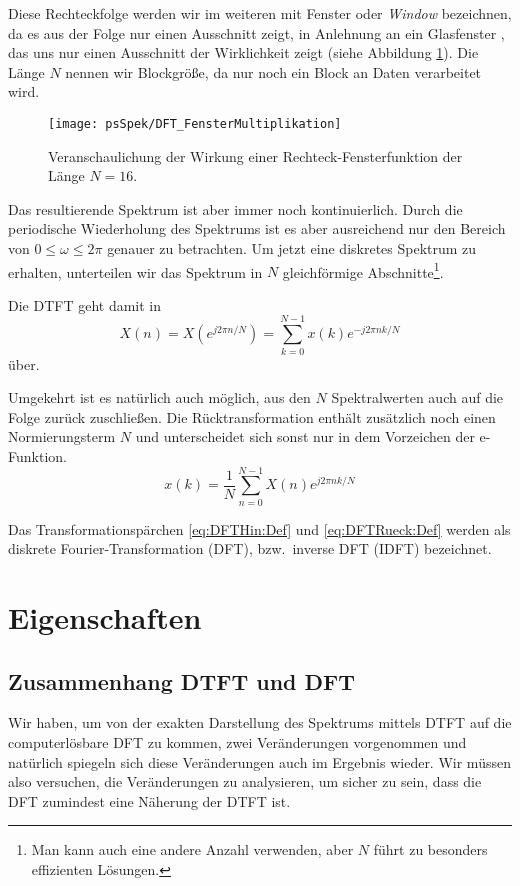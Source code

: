 Diese Rechteckfolge werden wir im weiteren mit Fenster oder {\em
Window} bezeichnen, da es aus der Folge nur einen Ausschnitt
zeigt, in Anlehnung an ein Glasfenster , das uns nur einen
Ausschnitt der Wirklichkeit zeigt (siehe Abbildung
\ref{pic:DFT_FensterMult}). Die Länge $N$ nennen wir Blockgröße,
da nur noch ein Block an Daten verarbeitet wird.

\begin{figure}[H]
\begin{center}
\texttt{[image: psSpek/DFT\_FensterMultiplikation]}
\caption{\label{pic:DFT_FensterMult}Veranschaulichung der Wirkung
einer Rechteck-Fensterfunktion der Länge $N = 16$.}
\end{center}
\end{figure}

Das resultierende Spektrum ist aber immer noch kontinuierlich.
Durch die periodische Wiederholung des Spektrums ist es aber
ausreichend nur den Bereich von $0 \leq \omega\leq 2\pi $ genauer
zu betrachten. Um jetzt eine diskretes Spektrum zu erhalten,
unterteilen wir das Spektrum in $N$ gleichförmige
Abschnitte\footnote{Man kann auch eine andere Anzahl verwenden,
aber $N$ führt zu besonders effizienten Lösungen.}.

Die DTFT geht damit in
\begin{equation}\label{eq:DFTHin:Def}
    X(n) = X\left(e^{j 2 \pi n / N}\right) = \sum_{k = 0}^{N-1}x(k) e^{-j 2 \pi n k /N}
\end{equation}
über.

Umgekehrt ist es natürlich auch möglich, aus den $N$
Spektralwerten auch auf die Folge zurück zuschließen. Die
Rücktransformation enthält zusätzlich noch einen Normierungsterm
$N$ und unterscheidet sich sonst nur in dem Vorzeichen der
e-Funktion.
\begin{equation}\label{eq:DFTRueck:Def}
    x(k) = \frac{1}{N} \sum_{n = 0}^{N-1}X(n) e^{j 2 \pi n k /N}
\end{equation}

Das Transformationspärchen \ref{eq:DFTHin:Def} und
\ref{eq:DFTRueck:Def} werden als diskrete Fourier-Transformation
(DFT), bzw.\ inverse DFT (IDFT) bezeichnet.


\section{Eigenschaften}
\subsection{Zusammenhang DTFT und DFT}
Wir haben, um von der exakten Darstellung des Spektrums mittels
DTFT auf die computerlösbare DFT zu kommen, zwei Veränderungen
vorgenommen und natürlich spiegeln sich diese Veränderungen auch
im Ergebnis wieder. Wir müssen also versuchen, die Veränderungen
zu analysieren, um sicher zu sein, dass die DFT zumindest eine
Näherung der DTFT ist.

